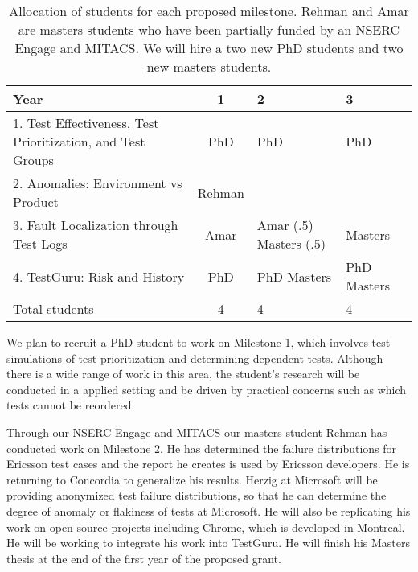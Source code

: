 \begin{table}[h]
\center
\caption{Allocation of students for each proposed milestone. Rehman and Amar are masters students who have been partially funded by an NSERC Engage and MITACS. We will hire a two new PhD students and two new masters students.}
\label{tableHQP}
\vspace{+3mm}

\begin{tabular}{  l | c | p{21mm} | p{20mm}  }
\hline
	\textbf{Year} & 1 & 2 & 3 \\ \hline
	1. Test Effectiveness, Test Prioritization, and Test Groups & PhD & PhD & PhD \\ 
	2. Anomalies: Environment vs Product & Rehman &  & \  \\ 
	3. Fault Localization through Test Logs & Amar & Amar (.5) Masters (.5) & Masters \\ 
	4. TestGuru: Risk and History & PhD & PhD \newline Masters &  PhD \newline Masters  \  \\ \hline
	Total students & 4 & 4 & 4 \\ \hline

\end{tabular}

\end{table}


We plan to recruit a PhD student to work on Milestone 1, which involves test simulations of test prioritization and determining dependent tests. Although there is a wide range of work in this area, the student's research will be conducted in a applied setting and be driven by practical concerns such as which tests cannot be reordered.

Through our NSERC Engage and MITACS our masters student Rehman has conducted work on Milestone 2. He has determined the failure distributions for Ericsson test cases and the report he creates is used by Ericsson developers. He is returning to Concordia to generalize his results. Herzig at Microsoft will be providing anonymized test failure distributions, so that he can determine the degree of anomaly or flakiness of tests at Microsoft. He will also be replicating his work on open source projects including Chrome, which is developed in Montreal. He will be working to integrate his work into TestGuru. He will finish his Masters thesis at the end of the first year of the proposed grant.

